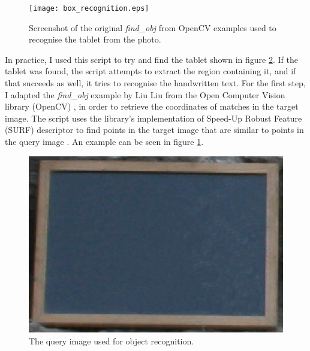 \documentclass [12pt,a4paper]{report}
\begin{document}
\begin{center}
\begin{figure}[h]
\centering
\texttt{[image: box\_recognition.eps]} %
\caption[Screenshot of \textit{find\_obj}]{Screenshot of the original \textit{find\_obj} from OpenCV examples used to recognise the tablet from the photo.}
\label{box_recognition}
\end{figure}
\end{center}

In practice, I used this script to try and find the tablet shown in figure \ref{box}. If the tablet was found, the script attempts to extract the region containing it, and if that succeeds as well, it tries to recognise the handwritten text. For the first step, I adapted the \textit{find\_obj} example by Liu Liu from the Open Computer Vision library (OpenCV) \cite{opencv}, in order to retrieve the coordinates of matches in the target image. The script uses the library's implementation of Speed-Up Robust Feature (SURF) descriptor to find points in the target image that are similar to points in the query image \cite{bay2006surf}. An example can be seen in figure \ref{box_recognition}.

\begin{center}
\begin{figure}[h]
\centering
\includegraphics[scale=0.8]{box.eps} %
\caption{The query image used for object recognition.}
\label{box}
\end{figure}
\end{center} 
\end{document}
